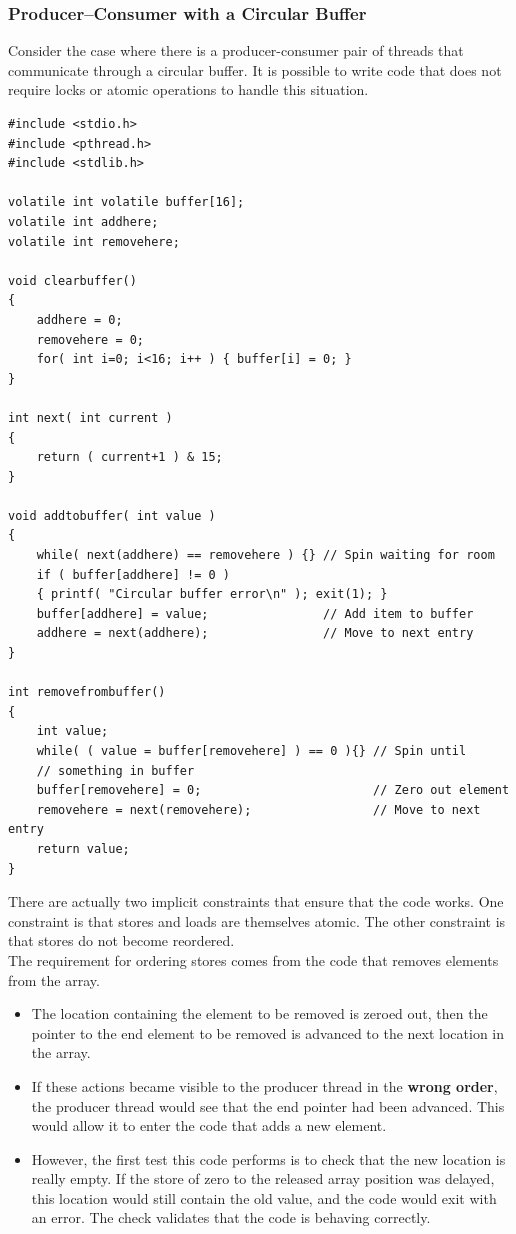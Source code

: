 \documentclass[12pt,a4paper]{report}
\begin{document}
\subsubsection*{Producer--Consumer with a Circular Buffer}
Consider the case where there is a producer-consumer pair of threads that communicate through a circular buffer. It is possible to write code that does not require locks or atomic operations to handle this situation.
\begin{lstlisting}
#include <stdio.h>
#include <pthread.h>
#include <stdlib.h>

volatile int volatile buffer[16];
volatile int addhere;
volatile int removehere;

void clearbuffer()
{
	addhere = 0;
	removehere = 0;
	for( int i=0; i<16; i++ ) { buffer[i] = 0; }
}

int next( int current )
{
	return ( current+1 ) & 15;
}

void addtobuffer( int value )
{
	while( next(addhere) == removehere ) {} // Spin waiting for room
	if ( buffer[addhere] != 0 )
	{ printf( "Circular buffer error\n" ); exit(1); }
	buffer[addhere] = value;                // Add item to buffer
	addhere = next(addhere);                // Move to next entry
}

int removefrombuffer()
{
	int value;
	while( ( value = buffer[removehere] ) == 0 ){} // Spin until
	// something in buffer
	buffer[removehere] = 0;                        // Zero out element
	removehere = next(removehere);                 // Move to next entry
	return value;
}
\end{lstlisting}
There are actually two implicit constraints that ensure that the code works. One constraint is that stores and loads are themselves atomic. The other constraint is that stores do not become reordered.
\\
The requirement for ordering stores comes from the code that removes elements from the array.
\begin{itemize}
	\item The location containing the element to be removed is zeroed out, then the pointer to the end element to be removed is advanced to the next location in the array.
	\item If these actions became visible to the producer thread in the \textbf{wrong order}, the producer thread would see that the end pointer had been advanced. This would allow it to enter the code that adds a new element.
	\item However, the first test this code performs is to check that the new location is really empty. If the store of zero to the released array position was delayed, this location would still contain the old value, and the code would exit with an error. The check validates that the code is behaving correctly.
\end{itemize}
\end{document}
